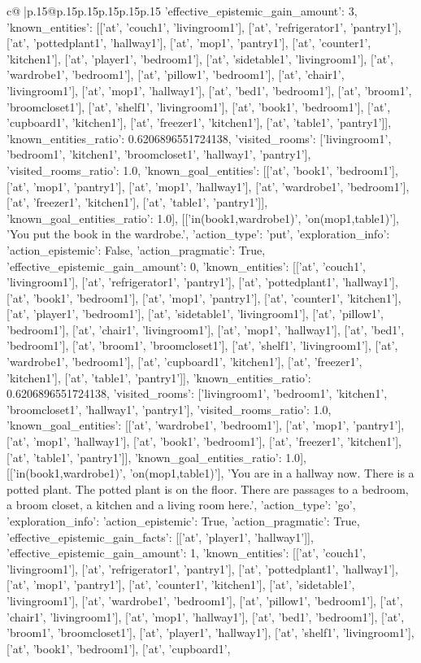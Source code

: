 \documentclass{article}
\begin{document}
{\begin{supertabular}{c@{$\;$}|p{.15\linewidth}@{}p{.15\linewidth}p{.15\linewidth}p{.15\linewidth}p{.15\linewidth}p{.15\linewidth}}
{{{'effective_epistemic_gain_amount': 3, 'known_entities': [['at', 'couch1', 'livingroom1'], ['at', 'refrigerator1', 'pantry1'], ['at', 'pottedplant1', 'hallway1'], ['at', 'mop1', 'pantry1'], ['at', 'counter1', 'kitchen1'], ['at', 'player1', 'bedroom1'], ['at', 'sidetable1', 'livingroom1'], ['at', 'wardrobe1', 'bedroom1'], ['at', 'pillow1', 'bedroom1'], ['at', 'chair1', 'livingroom1'], ['at', 'mop1', 'hallway1'], ['at', 'bed1', 'bedroom1'], ['at', 'broom1', 'broomcloset1'], ['at', 'shelf1', 'livingroom1'], ['at', 'book1', 'bedroom1'], ['at', 'cupboard1', 'kitchen1'], ['at', 'freezer1', 'kitchen1'], ['at', 'table1', 'pantry1']], 'known_entities_ratio': 0.6206896551724138, 'visited_rooms': ['livingroom1', 'bedroom1', 'kitchen1', 'broomcloset1', 'hallway1', 'pantry1'], 'visited_rooms_ratio': 1.0, 'known_goal_entities': [['at', 'book1', 'bedroom1'], ['at', 'mop1', 'pantry1'], ['at', 'mop1', 'hallway1'], ['at', 'wardrobe1', 'bedroom1'], ['at', 'freezer1', 'kitchen1'], ['at', 'table1', 'pantry1']], 'known_goal_entities_ratio': 1.0}}], [['in(book1,wardrobe1)', 'on(mop1,table1)'], 'You put the book in the wardrobe.', {'action_type': 'put', 'exploration_info': {'action_epistemic': False, 'action_pragmatic': True, 'effective_epistemic_gain_amount': 0, 'known_entities': [['at', 'couch1', 'livingroom1'], ['at', 'refrigerator1', 'pantry1'], ['at', 'pottedplant1', 'hallway1'], ['at', 'book1', 'bedroom1'], ['at', 'mop1', 'pantry1'], ['at', 'counter1', 'kitchen1'], ['at', 'player1', 'bedroom1'], ['at', 'sidetable1', 'livingroom1'], ['at', 'pillow1', 'bedroom1'], ['at', 'chair1', 'livingroom1'], ['at', 'mop1', 'hallway1'], ['at', 'bed1', 'bedroom1'], ['at', 'broom1', 'broomcloset1'], ['at', 'shelf1', 'livingroom1'], ['at', 'wardrobe1', 'bedroom1'], ['at', 'cupboard1', 'kitchen1'], ['at', 'freezer1', 'kitchen1'], ['at', 'table1', 'pantry1']], 'known_entities_ratio': 0.6206896551724138, 'visited_rooms': ['livingroom1', 'bedroom1', 'kitchen1', 'broomcloset1', 'hallway1', 'pantry1'], 'visited_rooms_ratio': 1.0, 'known_goal_entities': [['at', 'wardrobe1', 'bedroom1'], ['at', 'mop1', 'pantry1'], ['at', 'mop1', 'hallway1'], ['at', 'book1', 'bedroom1'], ['at', 'freezer1', 'kitchen1'], ['at', 'table1', 'pantry1']], 'known_goal_entities_ratio': 1.0}}], [['in(book1,wardrobe1)', 'on(mop1,table1)'], 'You are in a hallway now. There is a potted plant. The potted plant is on the floor. There are passages to a bedroom, a broom closet, a kitchen and a living room here.', {'action_type': 'go', 'exploration_info': {'action_epistemic': True, 'action_pragmatic': True, 'effective_epistemic_gain_facts': [['at', 'player1', 'hallway1']], 'effective_epistemic_gain_amount': 1, 'known_entities': [['at', 'couch1', 'livingroom1'], ['at', 'refrigerator1', 'pantry1'], ['at', 'pottedplant1', 'hallway1'], ['at', 'mop1', 'pantry1'], ['at', 'counter1', 'kitchen1'], ['at', 'sidetable1', 'livingroom1'], ['at', 'wardrobe1', 'bedroom1'], ['at', 'pillow1', 'bedroom1'], ['at', 'chair1', 'livingroom1'], ['at', 'mop1', 'hallway1'], ['at', 'bed1', 'bedroom1'], ['at', 'broom1', 'broomcloset1'], ['at', 'player1', 'hallway1'], ['at', 'shelf1', 'livingroom1'], ['at', 'book1', 'bedroom1'], ['at', 'cupboard1', }}}
\end{supertabular}}
\end{document}
